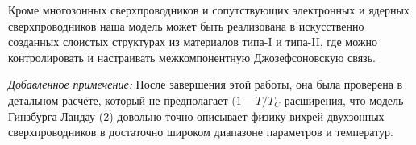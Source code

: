 Кроме многозонных сверхпроводников и сопутствующих электронных и ядерных 
сверхпроводников наша модель может быть реализована в искусственно созданных 
слоистых структурах из материалов типа-I и типа-II, где можно контролировать 
и настраивать межкомпонентную Джозефсоновскую связь.

\emph{Добавленное примечение:} После завершения этой работы, она была проверена в 
детальном расчёте, который не предполагает \( (1-T/T_C \) расширения, что 
модель Гинзбурга-Ландау (2) довольно точно описывает физику вихрей 
двухзонных сверхпроводников в достаточно широком диапазоне параметров и 
температур.